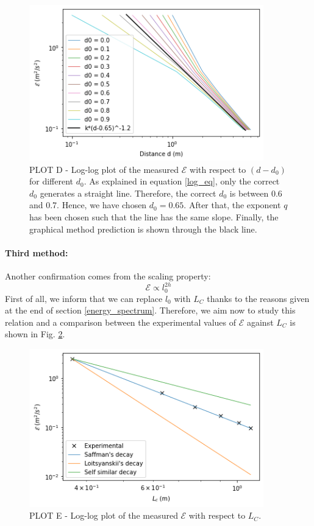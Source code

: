 \documentclass[11pt,titlepage]{article}
\begin{document}
	\begin{center} 
	\begin{figure} [h]
		\centering
		\includegraphics[width = 4in]{./figures/ex1_5_2.png}
		\caption{PLOT D - Log-log plot of the measured $\mathcal{E}$ with respect to $(d-d_0)$ for different $d_0$. As explained in equation \ref{log_eq}, only the correct $d_0$ generates a straight line. Therefore, the correct $d_0$ is between 0.6 and 0.7. Hence, we have chosen $d_0=0.65$.  After that, the exponent $q$ has been chosen such that the line has the same slope. Finally, the graphical method prediction is shown through the black line.}
		\label{fig6}
	\end{figure}
\end{center}


\paragraph{Third method:}
Another confirmation comes from the scaling property:
\begin{equation}\label{eq_E_L0}
	\mathcal{E} \propto l_0^{2h}
\end{equation}
First of all, we inform that we can replace $l_0$ with $L_C$ thanks to the reasons given at the end of section \ref{energy_spectrum}. Therefore, we aim now to study this relation and a comparison between the experimental values of $\mathcal{E}$ against $L_C$ is shown in Fig. \ref{fig7}. 

	\begin{center} 
	\begin{figure} [h!]
		\centering
		\includegraphics[width = 4in]{./figures/ex1_5_3.png}
		\caption{PLOT E - Log-log plot of the measured $\mathcal{E}$ with respect to $L_C$.}
		\label{fig7}
	\end{figure}
\end{center}
\end{document}
